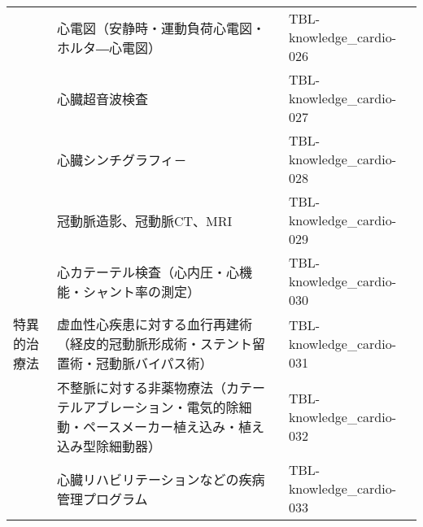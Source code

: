 \begin{xltabular}{\linewidth}{XXX}
 & 心電図（安静時・運動負荷心電図・ホルタ―心電図） & TBL-knowledge_cardio-026 \\
 & 心臓超音波検査 & TBL-knowledge_cardio-027 \\
 & 心臓シンチグラフィ－ & TBL-knowledge_cardio-028 \\
 & 冠動脈造影、冠動脈CT、MRI & TBL-knowledge_cardio-029 \\
 & 心カテーテル検査（心内圧・心機能・シャント率の測定） & TBL-knowledge_cardio-030 \\
特異的治療法 & 虚血性心疾患に対する血行再建術（経皮的冠動脈形成術・ステント留置術・冠動脈バイパス術） & TBL-knowledge_cardio-031 \\
 & 不整脈に対する非薬物療法（カテーテルアブレーション・電気的除細動・ペースメーカー植え込み・植え込み型除細動器） & TBL-knowledge_cardio-032 \\
 & 心臓リハビリテーションなどの疾病管理プログラム & TBL-knowledge_cardio-033 \\
\bottomrule
\end{xltabular}

